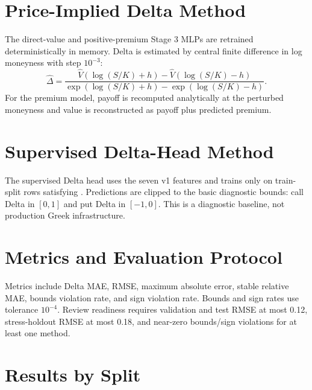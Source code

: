 \documentclass[11pt,a4paper]{article}
\newcommand{\code}[1]{\path{#1}}
\begin{document}
\section{Price-Implied Delta Method}

The direct-value and positive-premium Stage 3 MLPs are retrained deterministically in memory. Delta
is estimated by central finite difference in log moneyness with step \(10^{-3}\):
\[
\widehat\Delta =
\frac{\widehat V(\log(S/K)+h)-\widehat V(\log(S/K)-h)}
{\exp(\log(S/K)+h)-\exp(\log(S/K)-h)}.
\]
For the premium model, payoff is recomputed analytically at the perturbed moneyness and value is
reconstructed as payoff plus predicted premium.

\section{Supervised Delta-Head Method}

The supervised Delta head uses the seven v1 features and trains only on train-split rows satisfying
\code{delta_allowed_mask}. Predictions are clipped to the basic diagnostic bounds: call Delta in
\([0,1]\) and put Delta in \([-1,0]\). This is a diagnostic baseline, not production Greek
infrastructure.

\section{Metrics and Evaluation Protocol}

Metrics include Delta MAE, RMSE, maximum absolute error, stable relative MAE, bounds violation rate,
and sign violation rate. Bounds and sign rates use tolerance \(10^{-4}\). Review readiness requires
validation and test RMSE at most 0.12, stress-holdout RMSE at most 0.18, and near-zero bounds/sign
violations for at least one method.

\section{Results by Split}
\end{document}
